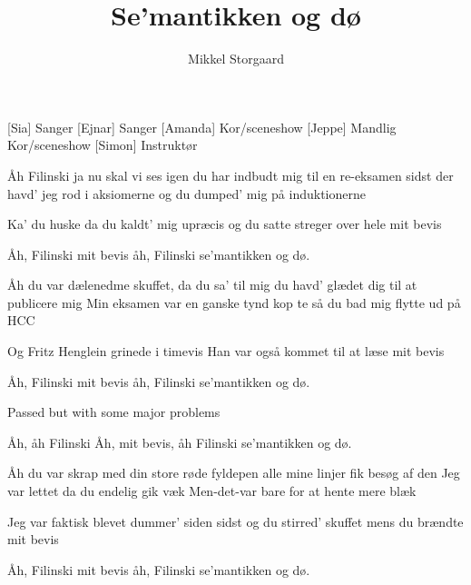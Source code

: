 \documentclass[a4paper,11pt]{article}
\title{Se'mantikken og dø}
\author{Mikkel Storgaard}
\begin{document}
\maketitle

\begin{roles}
[Sia] Sanger
[Ejnar] Sanger
[Amanda] Kor/sceneshow
[Jeppe] Mandlig Kor/sceneshow
[Simon] Instruktør
\end{roles}

\begin{song}
%
Åh Filinski ja nu skal vi ses igen
du har indbudt mig til en re-eksamen
sidst der havd' jeg rod i aksiomerne
og du dumped' mig på induktionerne

%
Ka' du huske da du kaldt' mig upræcis
og du satte streger over hele mit bevis

%
Åh, Filinski
mit bevis
åh, Filinski
se'mantikken og dø.

%
Åh du var dælenedme skuffet, da du sa' til mig
du havd' glædet dig til at publicere mig
Min eksamen var en ganske tynd kop te
så du bad mig flytte ud på HCC

%
Og Fritz Henglein grinede i timevis
Han var også kommet til at læse mit bevis

%
Åh, Filinski
mit bevis
åh, Filinski
se'mantikken og dø.

 Passed but with some major problems


%
Åh, åh Filinski
Åh, mit bevis, åh Filinski
se'mantikken og dø.

%
Åh du var skrap med din store røde fyldepen
alle mine linjer fik besøg af den
Jeg var lettet da du endelig gik væk
Men-det-var bare for at hente mere blæk

%
Jeg var faktisk blevet dummer' siden sidst
og du stirred' skuffet mens du brændte mit bevis

%
Åh, Filinski
mit bevis
åh, Filinski
se'mantikken og dø.
\end{song}
\end{document}
